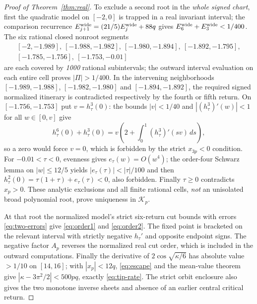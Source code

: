 \begin{proof}[Proof of Theorem~\ref{thm:real}]
To exclude a second root in the \emph{whole signed chart},
first the quadratic model on $[-2,0]$ is trapped in
a real invariant interval; the comparison recurrence
$E_{j+1}^{\rm wide}=(21/5)E_j^{\rm wide}+88q$
gives $E_6^{\rm wide}+E_3^{\rm wide}<1/400$.
The six rational closed nonroot segments
\[
\begin{split}
 [-2,-1.989],\ [-1.988,-1.982],\
 [-1.980,-1.894],\ [-1.892,-1.795],\\
 [-1.785,-1.756],\ [-1.753,-0.01]
\end{split}
\]
are each covered by \emph{1000} rational subintervals;
the outward interval evaluation on each entire cell
proves $|\Pi|>1/400$.  In the intervening neighborhoods
$[-1.989,-1.988]$, $[-1.982,-1.980]$ and
$[-1.894,-1.892]$, the required signed normalized
itinerary is contradicted respectively by the
fourth or fifth return.  On
$[-1.756,-1.753]$ put $v=h_\tau^3(0)$:
the bounds $|v|<1/40$ and
$|(h_\tau^3)'(w)|<1$ for all $w\in[0,v]$
give
\[
 h_\tau^6(0)+h_\tau^3(0)
 =v\left(2+\int_0^1(h_\tau^3)'(sv)\,ds\right),
\]
so a zero would force $v=0$, which is forbidden by the
strict $x_{3p}<0$ condition.
For $-0.01<\tau<0$, evenness gives
$e_\tau(w)=O(w^4)$; the order-four Schwarz
lemma on $|w|\le12/5$ yields
$|e_\tau(\tau)|<|\tau|/100$ and then
$h_\tau^2(0)=\tau(1+\tau)+e_\tau(\tau)<0$,
also forbidden.  Finally $\tau\ge0$
contradicts $x_p>0$.
These analytic exclusions and all finite rational
cells, \emph{not} an unisolated broad polynomial root,
prove uniqueness in $\mathcal K_p$.

At that root the normalized model's strict
six-return cut bounds with errors \eqref{eq:two-errors}
give \eqref{eq:order1} and
\eqref{eq:order2}.  The fixed point is bracketed
on the relevant interval with strictly negative
$h_\tau'$ and opposite endpoint signs.  The
negative factor $A_p$ reverses the normalized
real cut order, which is included in the
outward computations.  Finally the derivative
of $2\cos\sqrt{\kappa/6}$ has absolute value
$>1/10$ on $[14,16]$; with $|x_p|<12q$,
\eqref{eq:escape} and the mean-value theorem
give
$|\kappa-3\pi^2/2|<500pq$, exactly
\eqref{eq:tip-rate}.  The strict orbit enclosure
also gives the two monotone inverse sheets and
absence of an earlier central critical return.
\end{proof}


